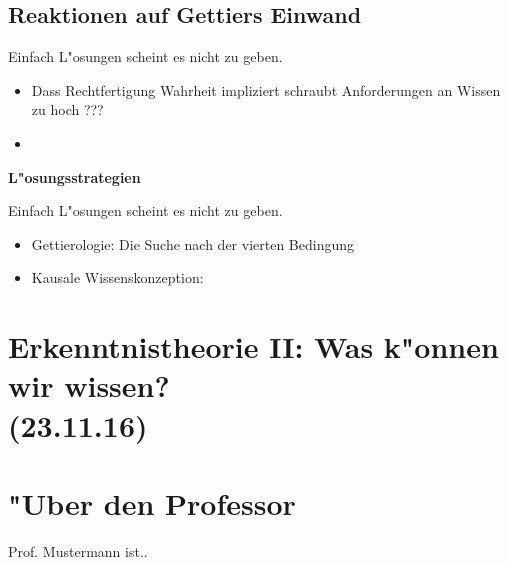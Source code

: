 \documentclass[emulatestandardclasses]{scrartcl}
\begin{document}
\subsection{Reaktionen auf Gettiers Einwand}

Einfach L"osungen scheint es nicht zu geben.
\begin{itemize}
  \item Dass Rechtfertigung Wahrheit impliziert schraubt Anforderungen an Wissen zu hoch ???
  \item 
\end{itemize}

\textbf{L"osungsstrategien}

Einfach L"osungen scheint es nicht zu geben.
\begin{itemize}
  \item Gettierologie: Die Suche nach der vierten Bedingung
  \item Kausale Wissenskonzeption: 
\end{itemize}




\section{Erkenntnistheorie II: Was k"onnen wir wissen?\\(23.11.16)}

\newpage
\section{"Uber den Professor}
Prof. Mustermann ist..


\end{document}
